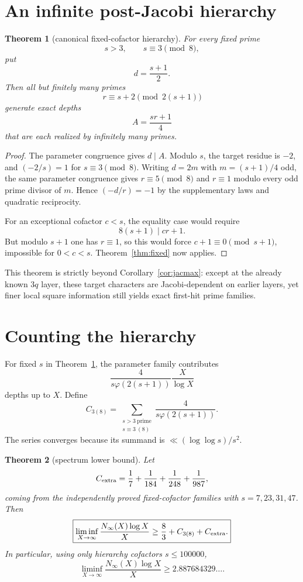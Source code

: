 \documentclass[11pt]{article}
\newtheorem{theorem}{Theorem}
\theoremstyle{definition}
\begin{document}
\section{An infinite post-Jacobi hierarchy}
\begin{theorem}[canonical fixed-cofactor hierarchy]\label{thm:hier}
For every fixed prime
\[
s>3,\qquad s\equiv3\pmod8,
\]
put
\[
d=\frac{s+1}{2}.
\]
Then all but finitely many primes
\[
\boxed{r\equiv s+2\pmod{2(s+1)}}
\]
generate exact depths
\[
\boxed{A=\frac{sr+1}{4}}
\]
that are each realized by infinitely many primes.
\end{theorem}

\begin{proof}
The parameter congruence gives $d\mid A$. Modulo $s$, the target residue is $-2$, and $(-2/s)=1$ for $s\equiv3\pmod8$. Writing $d=2m$ with $m=(s+1)/4$ odd, the same parameter congruence gives $r\equiv5\pmod8$ and $r\equiv1$ modulo every odd prime divisor of $m$. Hence $(-d/r)=-1$ by the supplementary laws and quadratic reciprocity.

For an exceptional cofactor $c<s$, the equality case would require
\[
8(s+1)\mid cr+1.
\]
But modulo $s+1$ one has $r\equiv1$, so this would force $c+1\equiv0\pmod{s+1}$, impossible for $0<c<s$. Theorem~\ref{thm:fixed} now applies.
\end{proof}

This theorem is strictly beyond Corollary~\ref{cor:jacmax}: except at the already known $3q$ layer, these target characters are Jacobi-dependent on earlier layers, yet finer local square information still yields exact first-hit prime families.

\section{Counting the hierarchy}
For fixed $s$ in Theorem~\ref{thm:hier}, the parameter family contributes
\[
\frac{4}{s\varphi(2(s+1))}\frac{X}{\log X}
\]
depths up to $X$. Define
\[
C_{3(8)}=
\sum_{\substack{s>3\ \mathrm{prime}\\s\equiv3\ (8)}}
\frac{4}{s\varphi(2(s+1))}.
\]
The series converges because its summand is $\ll(\log\log s)/s^2$.

\begin{theorem}[spectrum lower bound]\label{thm:count}
Let
\[
C_{\rm extra}=\frac17+\frac1{184}+\frac1{248}+\frac1{987},
\]
coming from the independently proved fixed-cofactor families with $s=7,23,31,47$. Then
\[
\boxed{
\liminf_{X\to\infty}
\frac{N_\infty(X)\log X}{X}
\ge
\frac83+C_{3(8)}+C_{\rm extra}.
}
\]
In particular, using only hierarchy cofactors $s\le100000$,
\[
\boxed{
\liminf_{X\to\infty}
\frac{N_\infty(X)\log X}{X}
\ge2.887684329\ldots .
}
\]
\end{theorem}
\end{document}
